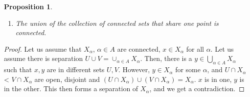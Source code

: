 \documentclass{article}
\newtheorem{proposition}{Proposition}
\begin{document}
 \begin{proposition}
 \begin{enumerate}[1)]
     \item The union of the collection of connected sets that share one point is connected. 
 \end{enumerate}
 \end{proposition}
 \begin{proof}
 Let us assume that $X_\alpha$, $\alpha\in A$ are connected, $x\in X_\alpha$ for all $\alpha$. Let us assume there is separation $U\cup V= \displaystyle\cup_{\alpha\in A}X_\alpha$. Then, there is a $y\in\displaystyle\bigcup_{\alpha\in A}X_\alpha$ such that $x,y$ are in different sets $U,V$. However, $y\in X_\alpha$ for some $\alpha$, and $U\cap X_\alpha$< $V\cap X_\alpha$ are open, disjoint and $(U\cap X_\alpha) \cup (V\cap X_\alpha)=X_\alpha$. $x$ is in one, $y$ is in the other. This then forms a separation of $X_\alpha$, and we get a contradiction.
 \end{proof}
 
\end{document}
